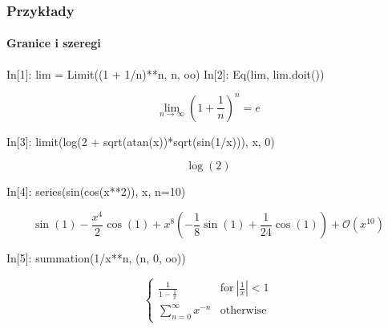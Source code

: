 \documentclass[10pt]{beamer}
\begin{document}
\begin{frame}[fragile]
  \frametitle{Przykłady}
  \framesubtitle{Granice i szeregi}

  \begin{python}
    In[1]: lim = Limit((1 + 1/n)**n, n, oo)
    In[2]: Eq(lim, lim.doit())
  \end{python}
  \begin{equation*}
    \lim_{n \to \infty} \left(1 + \frac{1}{n}\right)^{n} = e
  \end{equation*}

  \begin{python}
    In[3]: limit(log(2 + sqrt(atan(x))*sqrt(sin(1/x))), x, 0)
  \end{python}
  \begin{equation*}
    \log{\left (2 \right )}
  \end{equation*}

  \begin{python}
    In[4]: series(sin(cos(x**2)), x, n=10)
  \end{python}
  \begin{equation*}
    \sin{\left (1 \right )} - \frac{x^{4}}{2} \cos{\left (1 \right )} + x^{8} \left(- \frac{1}{8} \sin{\left (1 \right )} + \frac{1}{24} \cos{\left (1 \right )}\right) + \mathcal{O}\left(x^{10}\right)
  \end{equation*}

  \begin{python}
    In[5]: summation(1/x**n, (n, 0, oo))
  \end{python}
  \begin{equation*}
    \begin{cases} \frac{1}{1 - \frac{1}{x}} & \text{for}\: \left|{\frac{1}{x}}\right| < 1 \\\sum_{n=0}^{\infty} x^{- n} & \text{otherwise} \end{cases}
  \end{equation*}
\end{frame}
\end{document}
